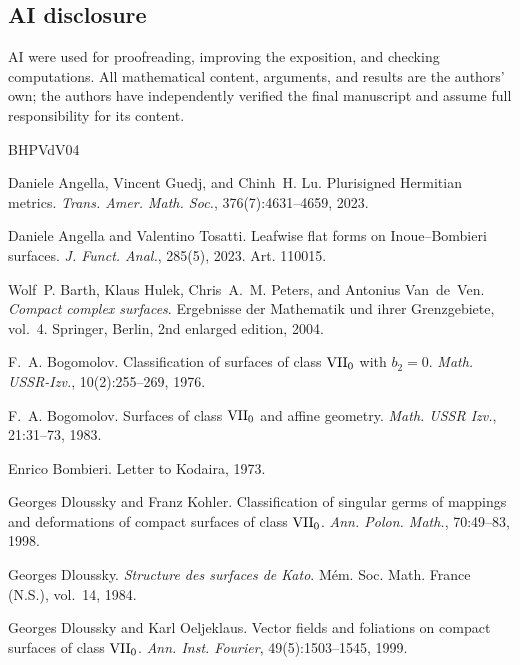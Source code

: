 \documentclass[12pt]{amsart}
\numberwithin{equation}{section}
\theoremstyle{remark}
\theoremstyle{definition}
\begin{document}
\subsection*{AI disclosure}
AI were used for proofreading, improving the exposition, and checking computations. All mathematical content, arguments, and results are the authors' own; the authors have independently verified the final manuscript and assume full responsibility for its content.

\begin{thebibliography}{BHPVdV04}

Daniele Angella, Vincent Guedj, and Chinh~H. Lu.
\newblock Plurisigned Hermitian metrics.
\newblock \emph{Trans. Amer. Math. Soc.}, 376(7):4631--4659, 2023.

Daniele Angella and Valentino Tosatti.
\newblock Leafwise flat forms on Inoue--Bombieri surfaces.
\newblock \emph{J. Funct. Anal.}, 285(5), 2023. Art. 110015.

Wolf~P. Barth, Klaus Hulek, Chris~A.~M. Peters, and Antonius Van~de~Ven.
\newblock \emph{Compact complex surfaces}.
\newblock Ergebnisse der Mathematik und ihrer Grenzgebiete, vol.~4. Springer, Berlin, 2nd enlarged edition, 2004.

F.~A. Bogomolov.
\newblock Classification of surfaces of class ${\rm VII}_0$ with $b_2=0$.
\newblock \emph{Math. USSR-Izv.}, 10(2):255--269, 1976.

F.~A. Bogomolov.
\newblock Surfaces of class ${\rm VII}_0$ and affine geometry.
\newblock \emph{Math. USSR Izv.}, 21:31--73, 1983.

Enrico Bombieri.
\newblock Letter to Kodaira, 1973.

Georges Dloussky and Franz Kohler.
\newblock Classification of singular germs of mappings and deformations of compact surfaces of class ${\rm VII}_0$.
\newblock \emph{Ann. Polon. Math.}, 70:49--83, 1998.

Georges Dloussky.
\newblock \emph{Structure des surfaces de Kato}.
\newblock M\'em. Soc. Math. France (N.S.), vol.~14, 1984.

Georges Dloussky and Karl Oeljeklaus.
\newblock Vector fields and foliations on compact surfaces of class ${\rm VII}_0$.
\newblock \emph{Ann. Inst. Fourier}, 49(5):1503--1545, 1999.


\end{thebibliography}
\end{document}
